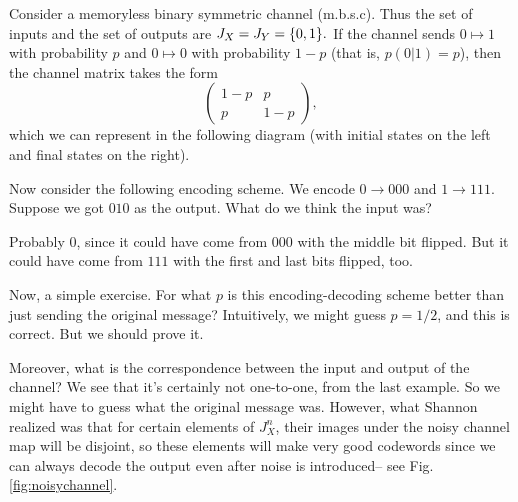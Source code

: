 \begin{exm}\label{exm:mbsc}
    Consider a memoryless binary symmetric channel (m.b.s.c). Thus the set of inputs and the set of outputs are $J_X=J_Y=\{0,1\}.$ If the channel sends $0\mapsto 1$ with probability $p$ and $0\mapsto 0$ with probability $1-p$ (that is, $p(0|1)=p$), then the channel matrix takes the form
    \begin{equation}
        \begin{pmatrix}
            1-p & p\\
            p & 1-p
        \end{pmatrix},
    \end{equation}
    which we can represent in the following diagram (with initial states on the left and final states on the right).
    
    
    Now consider the following encoding scheme. We encode $0\to 000$ and $1\to 111$. Suppose we got $010$ as the output. What do we think the input was?
    
    Probably $0$, since it could have come from $000$ with the middle bit flipped. But it could have come from $111$ with the first and last bits flipped, too.
    
    Now, a simple exercise. For what $p$ is this encoding-decoding scheme better than just sending the original message? Intuitively, we might guess $p=1/2$, and this is correct. But we should prove it.
\end{exm}

Moreover, what is the correspondence between the input and output of the channel? We see that it's certainly not one-to-one, from the last example. So we might have to guess what the original message was. However, what Shannon realized was that for certain elements of $J_X^n$, their images under the noisy channel map will be disjoint, so these elements will make very good codewords since we can always decode the output even after noise is introduced-- see Fig. \ref{fig:noisychannel}.

